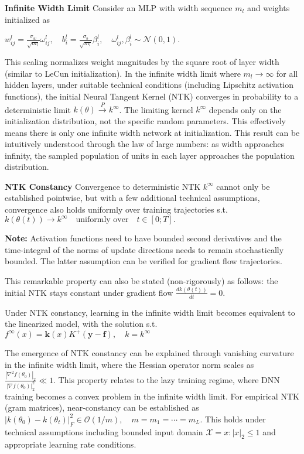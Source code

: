\textbf{Infinite Width Limit}
Consider an MLP with width sequence $m_l$ and weights initialized as

$w^l_{ij} = \frac{\sigma_w}{\sqrt{m_l}}\omega^l_{ij}, \quad b^l_i = \frac{\sigma_b}{\sqrt{m_l}}\beta^l_i, \quad \omega^l_{ij}, \beta^l_i \sim \mathcal{N}(0,1)$.

This scaling normalizes weight magnitudes by the square root of layer width (similar to LeCun initialization). In the infinite width limit where $m_l \to \infty$ for all hidden layers, under suitable technical conditions (including Lipschitz activation functions), the initial Neural Tangent Kernel (NTK) converges in probability to a deterministic limit
$k(\theta) \stackrel{P}{\to} k^\infty$.
The limiting kernel $k^\infty$ depends only on the initialization distribution, not the specific random parameters. This effectively means there is only one infinite width network at initialization. This result can be intuitively understood through the law of large numbers: as width approaches infinity, the sampled population of units in each layer approaches the population distribution.

\textbf{NTK Constancy}
Convergence to deterministic NTK $k^\infty$ cannot only be established pointwise, but with
 a few additional technical assumptions, convergence also holds uniformly over training
 trajectories s.t. $k(\theta(t)) \to k^\infty \quad \text{uniformly over} \quad t \in [0;T]
.$

\textbf{Note:} Activation functions need to have bounded second derivatives and the time-integral
 of the norms of update directions needs to remain stochastically bounded. The latter assumption can be verified for gradient flow trajectories.

This remarkable property can also be stated (non-rigorously) as follows: the initial NTK
 stays constant under gradient flow
 $\frac{dk(\theta(t))}{dt} = 0$.
 
Under NTK constancy, learning in the infinite width limit becomes equivalent to the linearized model, with the solution s.t.
$f^\infty(x) = \mathbf{k}(x)K^+(\mathbf{y} - \mathbf{f}), \quad k = k^\infty$

The emergence of NTK constancy can be explained through vanishing curvature in the infinite width limit, where the Hessian operator norm scales as
$\frac{|\nabla^2f(\theta_0)|_2}{|\nabla f(\theta_0)|_2^2} \ll 1$.
This property relates to the lazy training regime, where DNN training becomes a convex problem in the infinite width limit. For empirical NTK (gram matrices), near-constancy can be established as
$|k(\theta_0) - k(\theta_t)|_F^2 \in \mathcal{O}(1/m), \quad m = m_1 = \cdots = m_L$.
This holds under technical assumptions including bounded input domain $\mathcal{X} = {x : |x|_2 \leq 1}$ and appropriate learning rate conditions.

